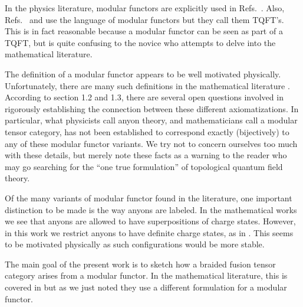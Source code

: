 \documentclass[aps, tightenlines, letterpaper, onecolumn, superscriptaddress, notitlepage, 11pt, groupedaddress]{revtex4-1}
\begin{document}
In the physics literature, modular functors are
explicitly used in Refs.~\cite{Freedman2002, Freedman2002simulation}.
Also, Refs.~\cite{Beverland2014} and \cite{Kitaev2006topo}
use the language of modular functors but they call them TQFT's.
This is in fact reasonable because a modular functor can be
seen as part of a TQFT, but is quite confusing to the
novice who attempts to delve into the mathematical literature.

The definition of a modular functor appears to
be well motivated physically.
Unfortunately, there are many such definitions
in the mathematical literature 
\cite{Walker1991,Turaev1994,Bakalov2001,Tillmann1998}.
According to \cite{Bartlett2015} section 1.2 and 1.3,
there are several open questions involved in 
rigorously establishing the connection between these different axiomatizations.
In particular, what physicists call anyon theory,
and mathematicians call a modular tensor category,
has not been established to correspond exactly
(bijectively) to any of these modular functor variants. 
We try not to concern ourselves too much with these details, 
but merely note these facts as a warning to the reader
who may go searching for the ``one true formulation'' of
topological quantum field theory.

Of the many variants of modular functor found in the literature,
one important distinction to be made is
the way anyons are labeled.
In the mathematical works \cite{Turaev1994, Bakalov2001, Tillmann1998} 
we see that anyons are allowed to have superpositions
of charge states. 
However, in this work we restrict anyons to have
definite charge states, as in \cite{Walker1991,Freedman2002simulation,Beverland2014}. 
This seems to be motivated physically as such configurations
would be more stable. %

The main goal of the present work is to sketch how a
braided fusion tensor category arises from a modular functor.
In the mathematical literature,
this is covered in \cite{Turaev1994,Tillmann1998,Bakalov2001}
but as we just noted they use a different formulation for a
modular functor.

\end{document}
